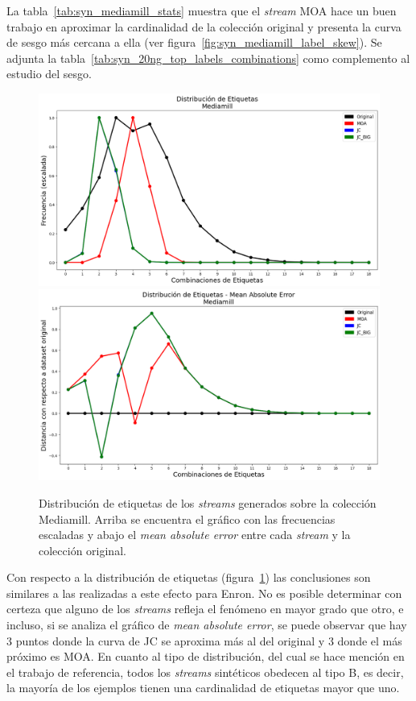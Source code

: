 La tabla~\ref{tab:syn_mediamill_stats} muestra que el \textit{stream} MOA hace
un buen trabajo en aproximar la cardinalidad de la colección original y presenta
la curva de sesgo más cercana a ella (ver
figura~\ref{fig:syn_mediamill_label_skew}). Se adjunta la
tabla~\ref{tab:syn_20ng_top_labels_combinations} como complemento al estudio del
sesgo.

\begin{figure}[htbp]
	\includegraphics[width=\linewidth]{figures/experiments/syn/mediamill/label_distribution.png}
	\includegraphics[width=\linewidth]{figures/experiments/syn/mediamill/ld_mae.png}
	\caption[Distribución de etiquetas de los \textit{streams} generados sobre la colección
		Mediamill.]{Distribución de etiquetas de los \textit{streams} generados sobre la colección
		Mediamill. Arriba se encuentra el gráfico con las frecuencias escaladas y
		abajo el \textit{mean absolute error} entre cada \textit{stream} y la
		colección original.}
	\label{fig:syn_mediamill_label_distribution}
\end{figure}

Con respecto a la distribución de etiquetas
(figura~\ref{fig:syn_mediamill_label_distribution}) las conclusiones son
similares a las realizadas a este efecto para Enron. No es posible determinar
con certeza que alguno de los \textit{streams} refleja el fenómeno en mayor
grado que otro, e incluso, si se analiza el gráfico de \textit{mean absolute
	error}, se puede observar que hay 3 puntos donde la curva de JC se aproxima más
al del original y 3 donde el más próximo es MOA. En cuanto al tipo de
distribución, del cual se hace mención en el trabajo de referencia, todos los
\textit{streams} sintéticos obedecen al tipo B, es decir, la mayoría de los
ejemplos tienen una cardinalidad de etiquetas mayor que uno.

